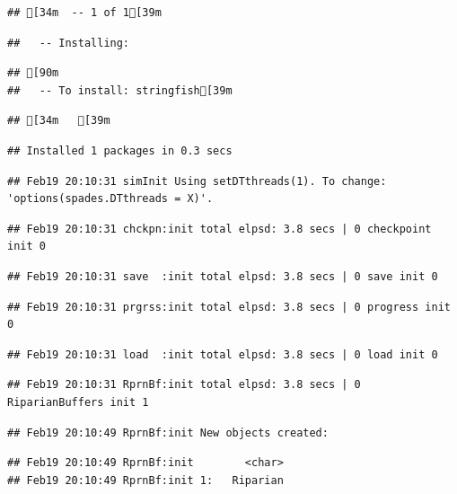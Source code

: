 \documentclass[
]{article}
\begin{document}
\begin{verbatim}
## [34m  -- 1 of 1[39m
\end{verbatim}

\begin{verbatim}
##   -- Installing:
\end{verbatim}

\begin{verbatim}
## [90m
##   -- To install: stringfish[39m
\end{verbatim}

\begin{verbatim}
## [34m   [39m
\end{verbatim}

\begin{verbatim}
## Installed 1 packages in 0.3 secs
\end{verbatim}

\begin{verbatim}
## Feb19 20:10:31 simInit Using setDTthreads(1). To change: 'options(spades.DTthreads = X)'.
\end{verbatim}

\begin{verbatim}
## Feb19 20:10:31 chckpn:init total elpsd: 3.8 secs | 0 checkpoint init 0
\end{verbatim}

\begin{verbatim}
## Feb19 20:10:31 save  :init total elpsd: 3.8 secs | 0 save init 0
\end{verbatim}

\begin{verbatim}
## Feb19 20:10:31 prgrss:init total elpsd: 3.8 secs | 0 progress init 0
\end{verbatim}

\begin{verbatim}
## Feb19 20:10:31 load  :init total elpsd: 3.8 secs | 0 load init 0
\end{verbatim}

\begin{verbatim}
## Feb19 20:10:31 RprnBf:init total elpsd: 3.8 secs | 0 RiparianBuffers init 1
\end{verbatim}

\begin{verbatim}
## Feb19 20:10:49 RprnBf:init New objects created:
\end{verbatim}

\begin{verbatim}
## Feb19 20:10:49 RprnBf:init        <char>
## Feb19 20:10:49 RprnBf:init 1:   Riparian
\end{verbatim}
\end{document}

